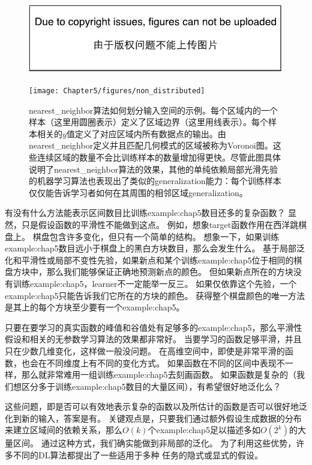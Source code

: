 \begin{figure}[!htb]
\ifOpenSource
\centerline{\includegraphics{figure.pdf}}
\else
\centerline{\texttt{[image: Chapter5/figures/non\_distributed]}}
\fi
\caption{\gls{nearest_neighbor}算法如何划分输入空间的示例。每个区域内的一个样本（这里用圆圈表示）定义了区域边界（这里用线表示）。每个样本相关的$y$值定义了对应区域内所有数据点的输出。由\gls{nearest_neighbor}定义并且匹配几何模式的区域被称为Voronoi图。这些连续区域的数量不会比训练样本的数量增加得更快。尽管此图具体说明了\gls{nearest_neighbor}算法的效果，其他的单纯依赖局部光滑先验的机器学习算法也表现出了类似的\gls{generalization}能力：每个训练样本仅仅能告诉学习者如何在其周围的相邻区域\gls{generalization}。}
\label{fig:chap5_non_distributed}
\end{figure}


有没有什么方法能表示区间数目比训练\gls{example:chap5}数目还多的复杂函数？
显然，只是假设函数的平滑性不能做到这点。
例如，想象\gls{target}函数作用在西洋跳棋盘上。
棋盘包含许多变化，但只有一个简单的结构。
想象一下，如果训练\gls{example:chap5}数目远小于棋盘上的黑白方块数目，那么会发生什么。
基于局部泛化和平滑性或局部不变性先验，如果新点和某个训练\gls{example:chap5}位于相同的棋盘方块中，那么我们能够保证正确地预测新点的颜色。
但如果新点所在的方块没有训练\gls{example:chap5}，\gls{learner}不一定能举一反三。
如果仅依靠这个先验，一个\gls{example:chap5}只能告诉我们它所在的方块的颜色。
获得整个棋盘颜色的唯一方法是其上的每个方块至少要有一个\gls{example:chap5}。


只要在要学习的真实函数的峰值和谷值处有足够多的\gls{example:chap5}，那么平滑性假设和相关的无参数学习算法的效果都非常好。
当要学习的函数足够平滑，并且只在少数几维变化，这样做一般没问题。
在高维空间中，即使是非常平滑的函数，也会在不同维度上有不同的变化方式。
如果函数在不同的区间中表现不一样，那么就非常难用一组训练\gls{example:chap5}去刻画函数。
如果函数是复杂的（我们想区分多于训练\gls{example:chap5}数目的大量区间），有希望很好地泛化么？

这些问题，即是否可以有效地表示复杂的函数以及所估计的函数是否可以很好地泛化到新的输入，答案是有。
关键观点是，只要我们通过额外假设生成数据的分布来建立区域间的依赖关系，那么$O(k)$个\gls{example:chap5}足以描述多如$O(2^k)$的大量区间。
通过这种方式，我们确实能做到非局部的泛化\citep{Bengio+Monperrus-2005,Bengio-Larochelle-NLMP-NIPS-2006-short}。
为了利用这些优势，许多不同的\gls{DL}算法都提出了一些适用于多种\,\,任务的隐式或显式的假设。


